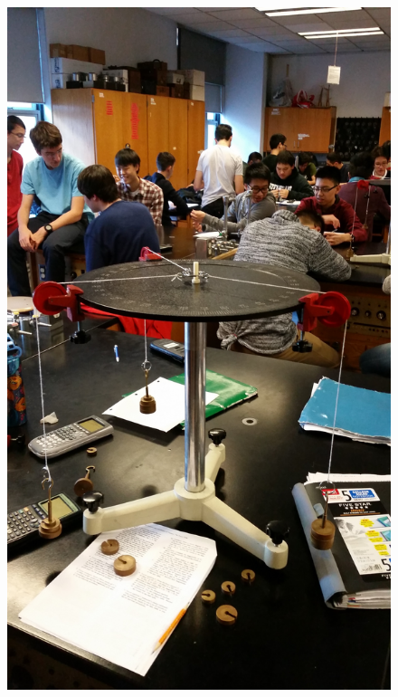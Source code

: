 \documentclass[11pt, titlepage]{article}
\begin{document}
\begin{figure}[p]
\centering
\hspace*{-10.5cm}
\includegraphics[scale=0.15, angle=270]{lab3.jpg}
\vspace*{19cm}
\end{figure}
\end{document}

